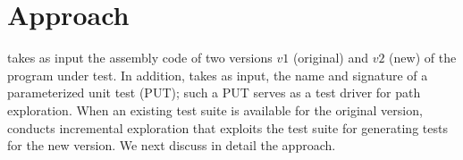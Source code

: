 \section{Approach}
\label{sec:approach}

 takes as input the assembly code of two versions $v1$ (original) and $v2$ (new) of the program under test. In addition,  takes as input, the name and signature of a parameterized unit test (PUT); such a PUT serves as a test driver for path exploration. 
When an existing test suite is available for the original version,  conducts incremental exploration that exploits the test suite for generating tests for the new version. We next discuss in detail the  approach. 



